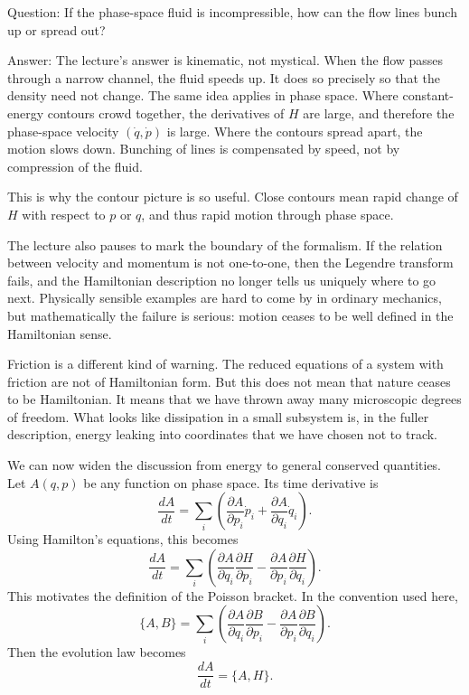 Question: If the phase-space fluid is incompressible, how can the flow lines bunch up or spread out?

Answer: The lecture's answer is kinematic, not mystical. When the flow passes through a narrow channel, the fluid speeds up. It does so precisely so that the density need not change. The same idea applies in phase space. Where constant-energy contours crowd together, the derivatives of \(H\) are large, and therefore the phase-space velocity \((\dot q,\dot p)\) is large. Where the contours spread apart, the motion slows down. Bunching of lines is compensated by speed, not by compression of the fluid.

This is why the contour picture is so useful. Close contours mean rapid change of \(H\) with respect to \(p\) or \(q\), and thus rapid motion through phase space.

The lecture also pauses to mark the boundary of the formalism. If the relation between velocity and momentum is not one-to-one, then the Legendre transform fails, and the Hamiltonian description no longer tells us uniquely where to go next. Physically sensible examples are hard to come by in ordinary mechanics, but mathematically the failure is serious: motion ceases to be well defined in the Hamiltonian sense.

Friction is a different kind of warning. The reduced equations of a system with friction are not of Hamiltonian form. But this does not mean that nature ceases to be Hamiltonian. It means that we have thrown away many microscopic degrees of freedom. What looks like dissipation in a small subsystem is, in the fuller description, energy leaking into coordinates that we have chosen not to track.

We can now widen the discussion from energy to general conserved quantities. Let \(A(q,p)\) be any function on phase space. Its time derivative is
\begin{equation}
\frac{dA}{dt}
=
\sum_i
\left(
\frac{\partial A}{\partial p_i}\dot p_i
+
\frac{\partial A}{\partial q_i}\dot q_i
\right).
\end{equation}
Using Hamilton's equations, this becomes
\begin{equation}
\frac{dA}{dt}
=
\sum_i
\left(
\frac{\partial A}{\partial q_i}\frac{\partial H}{\partial p_i}
-
\frac{\partial A}{\partial p_i}\frac{\partial H}{\partial q_i}
\right).
\end{equation}
This motivates the definition of the Poisson bracket. In the convention used here,
\begin{equation}
\{A,B\}
=
\sum_i
\left(
\frac{\partial A}{\partial q_i}\frac{\partial B}{\partial p_i}
-
\frac{\partial A}{\partial p_i}\frac{\partial B}{\partial q_i}
\right).
\end{equation}
Then the evolution law becomes
\begin{equation}
\frac{dA}{dt}=\{A,H\}.
\end{equation}

